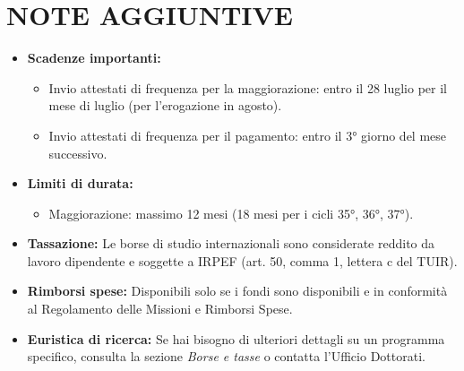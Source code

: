 \documentclass{article}
\begin{document}
\section{NOTE AGGIUNTIVE}
\begin{itemize}
    \item \textbf{Scadenze importanti:}
    \begin{itemize}
        \item Invio attestati di frequenza per la maggiorazione: entro il 28 luglio per il mese di luglio (per l’erogazione in agosto).
        \item Invio attestati di frequenza per il pagamento: entro il 3° giorno del mese successivo.
    \end{itemize}
    \item \textbf{Limiti di durata:}
    \begin{itemize}
        \item Maggiorazione: massimo 12 mesi (18 mesi per i cicli 35°, 36°, 37°).
    \end{itemize}
    \item \textbf{Tassazione:} Le borse di studio internazionali sono considerate reddito da lavoro dipendente e soggette a IRPEF (art. 50, comma 1, lettera c del TUIR).
    \item \textbf{Rimborsi spese:} Disponibili solo se i fondi sono disponibili e in conformità al Regolamento delle Missioni e Rimborsi Spese.
    \item \textbf{Euristica di ricerca:} Se hai bisogno di ulteriori dettagli su un programma specifico, consulta la sezione \textit{Borse e tasse} o contatta l’Ufficio Dottorati.
\end{itemize}
\end{document}
